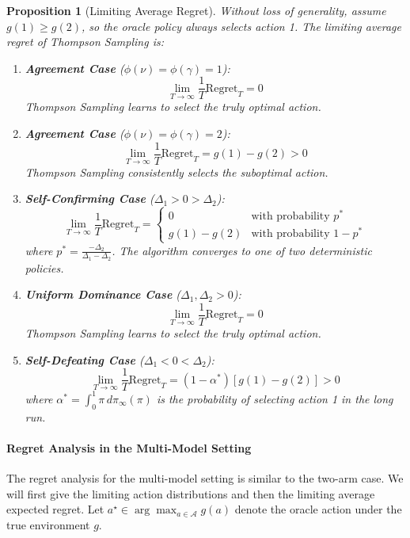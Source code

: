 \documentclass[12pt]{article}
\newtheorem{proposition}{Proposition}
\begin{document}
\begin{proposition}[Limiting Average Regret]
\label{prop:limiting_average_regret}
Without loss of generality, assume $g(1) \geq g(2)$, so the oracle policy always selects action 1. The limiting average regret of Thompson Sampling is:

\begin{enumerate}
    \item[(i)] \textbf{Agreement Case} ($\phi(\nu) = \phi(\gamma) = 1$): 
    \[\lim_{T \to \infty} \frac{1}{T} \text{Regret}_T = 0\]
    Thompson Sampling learns to select the truly optimal action.

    \item[(ii)] \textbf{Agreement Case} ($\phi(\nu) = \phi(\gamma) = 2$): 
    \[\lim_{T \to \infty} \frac{1}{T} \text{Regret}_T = g(1) - g(2) > 0\]
    Thompson Sampling consistently selects the suboptimal action.

    \item[(iii)] \textbf{Self-Confirming Case} ($\Delta_1 > 0 > \Delta_2$):
    \[\lim_{T \to \infty} \frac{1}{T} \text{Regret}_T = 
    \begin{cases}
    0 & \text{with probability } p^* \\
    g(1) - g(2) & \text{with probability } 1-p^*
    \end{cases}\]
    where $p^* = \frac{-\Delta_2}{\Delta_1 - \Delta_2}$. The algorithm converges to one of two deterministic policies.

    \item[(iv)] \textbf{Uniform Dominance Case} ($\Delta_1, \Delta_2 > 0$):
    \[\lim_{T \to \infty} \frac{1}{T} \text{Regret}_T = 0\]
    Thompson Sampling learns to select the truly optimal action.

    \item[(v)] \textbf{Self-Defeating Case} ($\Delta_1 < 0 < \Delta_2$):
    \[\lim_{T \to \infty} \frac{1}{T} \text{Regret}_T = (1-\alpha^*)[g(1) - g(2)] > 0\]
    where $\alpha^* = \int_0^1 \pi \, d\pi_{\infty}(\pi)$ is the probability of selecting action 1 in the long run.
\end{enumerate}
\end{proposition}


\paragraph{Regret Analysis in the Multi-Model Setting}

The regret analysis for the multi-model setting is similar to the two-arm case. We will first give the limiting action distributions and then the limiting average expected regret. Let $a^\star \in \arg\max_{a\in\mathcal A} g(a)$ denote the oracle action under the true environment $g$. 
\end{document}
